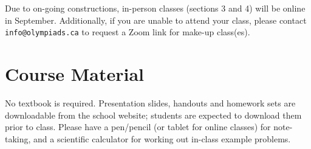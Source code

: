 \documentclass{../oss-handout}
\begin{document}
\begin{center}
\begin{tabular}{|c|c|c|c|}
  \end{tabular}
  \egroup
\end{center}
Due to on-going constructions, in-person classes (sections 3 and 4) will be
online in September. Additionally, if you are unable to attend your class,
please contact \texttt{info@olympiads.ca} to request a Zoom link for make-up
class(es).


\section{Course Material}
No textbook is required. Presentation slides, handouts and homework sets are
downloadable from the school website; students are expected to download them
prior to class. Please have a pen/pencil (or tablet for online classes) for
note-taking, and a scientific calculator for working out in-class example
problems.
\end{document}
